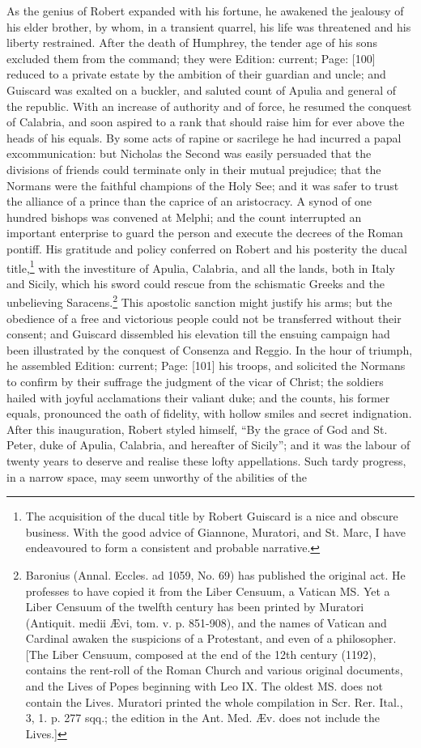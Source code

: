 As the genius of Robert expanded with his fortune, he awakened the jealousy of his elder brother, by whom, in a transient quarrel, his life was threatened and his liberty restrained. After the death of Humphrey, the tender age of his sons excluded them from the command; they were Edition: current; Page: [100] reduced to a private estate by the ambition of their guardian and uncle; and Guiscard was exalted on a buckler, and saluted count of Apulia and general of the republic. With an increase of authority and of force, he resumed the conquest of Calabria, and soon aspired to a rank that should raise him for ever above the heads of his equals. By some acts of rapine or sacrilege he had incurred a papal excommunication: but Nicholas the Second was easily persuaded that the divisions of friends could terminate only in their mutual prejudice; that the Normans were the faithful champions of the Holy See; and it was safer to trust the alliance of a prince than the caprice of an aristocracy. A synod of one hundred bishops was convened at Melphi; and the count interrupted an important enterprise to guard the person and execute the decrees of the Roman pontiff. His gratitude and policy conferred on Robert and his posterity the ducal title,\footnote{The acquisition of the ducal title by Robert Guiscard is a nice and obscure business. With the good advice of Giannone, Muratori, and St. Marc, I have endeavoured to form a consistent and probable narrative.} with the investiture of Apulia, Calabria, and all the lands, both in Italy and Sicily, which his sword could rescue from the schismatic Greeks and the unbelieving Saracens.\footnote{Baronius (Annal. Eccles. ad 1059, No. 69) has published the original act. He professes to have copied it from the Liber Censuum, a Vatican MS. Yet a Liber Censuum of the twelfth century has been printed by Muratori (Antiquit. medii Ævi, tom. v. p. 851-908), and the names of Vatican and Cardinal awaken the suspicions of a Protestant, and even of a philosopher. [The Liber Censuum, composed at the end of the 12th century (1192), contains the rent-roll of the Roman Church and various original documents, and the Lives of Popes beginning with Leo IX. The oldest MS. does not contain the Lives. Muratori printed the whole compilation in Scr. Rer. Ital., 3, 1. p. 277 sqq.; the edition in the Ant. Med. Æv. does not include the Lives.]} This apostolic sanction might justify his arms; but the obedience of a free and victorious people could not be transferred without their consent; and Guiscard dissembled his elevation till the ensuing campaign had been illustrated by the conquest of Consenza and Reggio. In the hour of triumph, he assembled Edition: current; Page: [101] his troops, and solicited the Normans to confirm by their suffrage the judgment of the vicar of Christ; the soldiers hailed with joyful acclamations their valiant duke; and the counts, his former equals, pronounced the oath of fidelity, with hollow smiles and secret indignation. After this inauguration, Robert styled himself, \texthebrew{“}By the grace of God and St. Peter, duke of Apulia, Calabria, and hereafter of Sicily\texthebrew{}”; and it was the labour of twenty years to deserve and realise these lofty appellations. Such tardy progress, in a narrow space, may seem unworthy of the abilities of the 